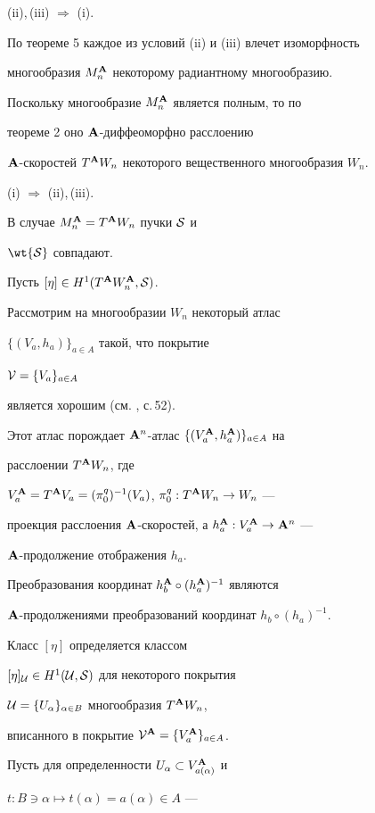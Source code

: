 \begin{pf}


(ii),\,(iii) $\Rightarrow$ (i).


По теореме 5 каждое из условий (ii) и (iii) влечет изоморфность


многообразия $M^{\bold A}_n$ некоторому радиантному многообразию.


Поскольку многообразие $M^{\bold A}_n$ является полным, то по


теореме 2  оно ${\bold A}$-диффеоморфно расслоению


${\bold A}$-скоростей $T^{\bold A} W_n$ некоторого вещественного многообразия $W_n$.





(i) $\Rightarrow$ (ii),\,(iii).


В случае $M^{\bold A}_n=T^{\bold A} W_n$ пучки ${\cal S}$ и


$\wt{\cal S}$ совпадают.


Пусть $[\eta]\in H^1 (T^{\bold A} W^{\bold A}_n,{\cal S})$.


Рассмотрим на многообразии $W_n$ некоторый атлас


$\{(V_a,h_a)\}_{a\in A}$ такой, что покрытие


${\cal V}=\{V_a\}_{a\in A}$


является хорошим (см. \cite{Bott}, с.\,52).


Этот атлас порождает ${\bold A}^n$-атлас $\{(V^{\bold A}_a,h^{\bold A}_a)\}_{a\in A}$ на


расслоении $T^{\bold A} W_n$, где


$V^{\bold A}_a=T^{\bold A} V_a=({\pi^q_0})^{-1}(V_a)$, ${\pi^q_0}:T^{\bold A} W_n\to W_n$ ---


проекция расслоения ${\bold A}$-скоростей, а $h^{\bold A}_a:V^{\bold A}_a\to{\bold A}^n$ ---


${\bold A}$-продолжение отображения $h_a$.


Преобразования координат $h^{\bold A}_b\circ(h^{\bold A}_a)^{-1}$ являются


${\bold A}$-продолжениями преобразований координат $h_b\circ(h_a)^{-1}$.


Класс $[\eta]$ определяется классом


$[\eta]_{\cal U}\in H^1({\cal U},{\cal S})$ для некоторого покрытия


${\cal U}=\{U_\alpha\}_{\alpha\in B}$ многообразия $T^{\bold A} W_n$,


вписанного в покрытие ${\cal V}^{\bold A}=\{V^{\bold A}_a\}_{a\in A}$.


Пусть для определенности $U_\alpha\subset V^{\bold A}_{a(\alpha)}$ и


$t:B\ni\alpha\mapsto t(\alpha)=a(\alpha)\in A$ ---



\end{pf}
